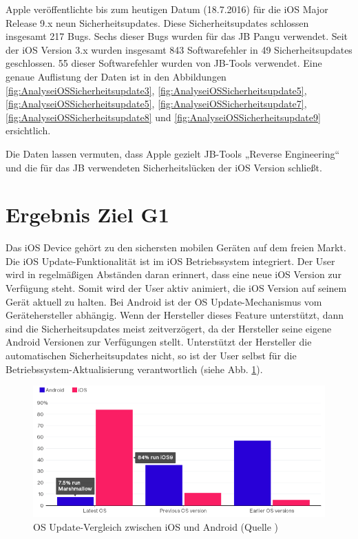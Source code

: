Apple veröffentlichte bis zum heutigen Datum (18.7.2016) für die iOS Major Release 9.x neun Sicherheitsupdates. Diese Sicherheitsupdates schlossen insgesamt 217 Bugs. Sechs dieser Bugs wurden für das JB Pangu verwendet.  Seit der iOS Version 3.x wurden insgesamt 843 Softwarefehler in 49 Sicherheitsupdates geschlossen. 55 dieser Softwarefehler wurden von JB-Tools verwendet. Eine genaue Auflistung der Daten ist in den Abbildungen \ref{fig:AnalyseiOSSicherheitsupdate3}, \ref{fig:AnalyseiOSSicherheitsupdate5}, \ref{fig:AnalyseiOSSicherheitsupdate5}, \ref{fig:AnalyseiOSSicherheitsupdate7}, \ref{fig:AnalyseiOSSicherheitsupdate8} und \ref{fig:AnalyseiOSSicherheitsupdate9} ersichtlich.

Die Daten lassen vermuten, dass Apple gezielt JB-Tools „Reverse Engineering“ und die für das JB verwendeten Sicherheitslücken der iOS Version schließt.

\section{Ergebnis Ziel G1}
\label{sec:AnalyseG1}

Das iOS Device gehört zu den sichersten mobilen Geräten auf dem freien Markt. Die iOS Update-Funktionalität ist im iOS Betriebssystem integriert. Der User wird in regelmäßigen Abständen daran erinnert, dass eine neue iOS Version zur Verfügung steht. Somit wird der User aktiv animiert, die iOS Version auf seinem Gerät aktuell zu halten. Bei Android ist der OS Update-Mechanismus vom Gerätehersteller abhängig. Wenn der Hersteller dieses Feature unterstützt, dann sind die Sicherheitsupdates meist zeitverzögert, da der Hersteller seine eigene Android Versionen zur Verfügungen stellt. Unterstützt der Hersteller die automatischen Sicherheitsupdates nicht, so ist der User selbst für die Betriebssystem-Aktualisierung verantwortlich (siehe Abb. \ref{fig:VergleichUpdateiOSAndroid}).\par
 \begin{figure}[hp!]
        \centering
                \includegraphics[scale=0.8]{Bilder/updatesiOSAndroid.PNG}
        \caption{OS Update-Vergleich zwischen iOS und Android (Quelle \cite{ANDROID[1]})}
        \label{fig:VergleichUpdateiOSAndroid}
\end{figure}

